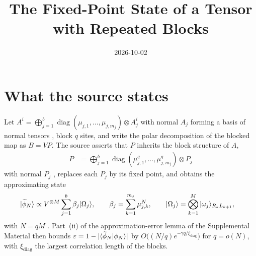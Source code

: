 \documentclass{article}
\title{The Fixed-Point State of a Tensor with Repeated Blocks}
\author{}
\date{2026-10-02}
\begin{document}
\maketitle
{}

\section{What the source states}
Let $A^i=\bigoplus_{j=1}^b\operatorname{diag}(\mu_{j,1},\dots,\mu_{j,m_j})
    \otimes A_j^i$ with normal $A_j$ forming a basis of normal tensors
\cite[eq.~(S2)]{Malz2024Preparation}, block $q$ sites, and write the polar
decomposition of the blocked map as $B=VP$. The source asserts that $P$
inherits the block structure of $A$,
\begin{align}
    P & =\bigoplus_{j=1}^b\operatorname{diag}(\mu_{j,1}^q,\dots,\mu_{j,m_j}^q)
    \otimes P_j
    \label{eq:mswc24_block_form}
\end{align}
with normal $P_j$ \cite[eq.~(S5)]{Malz2024Preparation}, replaces each $P_j$ by
its fixed point, and obtains the approximating state
\begin{align}
    |\widetilde\phi_N\rangle
     & \propto V^{\otimes M}\sum_{j=1}^b\beta_j|\Omega_j\rangle,
    \qquad \beta_j=\sum_{k=1}^{m_j}\mu_{j,k}^N,\qquad
    |\Omega_j\rangle=\bigotimes_{k=1}^M|\omega_j\rangle_{R_kL_{k+1}},
    \label{eq:mswc24_approx_state}
\end{align}
with $N=qM$ \cite[eq.~(S7)]{Malz2024Preparation}. Part~(ii) of the
approximation-error lemma of the Supplemental Material then bounds
$\varepsilon=1-\lvert\langle \widetilde\phi_N | \phi_N \rangle\rvert$ by
$O\bigl((N/q)e^{-\gamma q/\xi_{\mathrm{diag}}}\bigr)$ for $q=o(N)$, with
$\xi_{\mathrm{diag}}$ the largest correlation length of the blocks.
\end{document}
